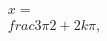 \documentclass[preview]{standalone}
\begin{document}
\begin{align*}
x = \\frac{3\pi}{2} + 2k\pi,
\end{align*}
\end{document}
